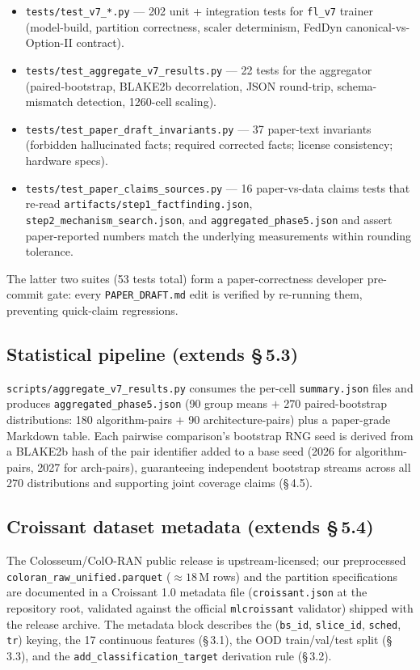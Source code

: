 \documentclass[journal]{IEEEtran}
\begin{document}
\begin{itemize}
  \item \lstinline|tests/test_v7_*.py| --- 202 unit + integration tests for \lstinline|fl_v7| trainer (model-build, partition correctness, scaler determinism, FedDyn canonical-vs-Option-II contract).
  \item \lstinline|tests/test_aggregate_v7_results.py| --- 22 tests for the aggregator (paired-bootstrap, BLAKE2b decorrelation, JSON round-trip, schema-mismatch detection, 1260-cell scaling).
  \item \lstinline|tests/test_paper_draft_invariants.py| --- 37 paper-text invariants (forbidden hallucinated facts; required corrected facts; license consistency; hardware specs).
  \item \lstinline|tests/test_paper_claims_sources.py| --- 16 paper-vs-data claims tests that re-read \lstinline|artifacts/step1_factfinding.json|, \lstinline|step2_mechanism_search.json|, and \lstinline|aggregated_phase5.json| and assert paper-reported numbers match the underlying measurements within rounding tolerance.
\end{itemize}

The latter two suites (53 tests total) form a paper-correctness developer pre-commit gate: every \lstinline|PAPER_DRAFT.md| edit is verified by re-running them, preventing quick-claim regressions.

\subsection{Statistical pipeline (extends \S\,5.3)}

\lstinline|scripts/aggregate_v7_results.py| consumes the per-cell \lstinline|summary.json| files and produces \lstinline|aggregated_phase5.json| (90 group means $+$ 270 paired-bootstrap distributions: 180 algorithm-pairs $+$ 90 architecture-pairs) plus a paper-grade Markdown table. Each pairwise comparison's bootstrap RNG seed is derived from a BLAKE2b hash of the pair identifier added to a base seed (2026 for algorithm-pairs, 2027 for arch-pairs), guaranteeing independent bootstrap streams across all 270 distributions and supporting joint coverage claims (\S\,4.5).

\subsection{Croissant dataset metadata (extends \S\,5.4)}

The Colosseum/ColO-RAN public release is upstream-licensed; our preprocessed \lstinline|coloran_raw_unified.parquet| ($\approx 18$\,M rows) and the partition specifications are documented in a Croissant 1.0 metadata file (\lstinline|croissant.json| at the repository root, validated against the official \lstinline|mlcroissant| validator) shipped with the release archive. The metadata block describes the (\lstinline|bs_id|, \lstinline|slice_id|, \lstinline|sched|, \lstinline|tr|) keying, the 17 continuous features (\S\,3.1), the OOD train/val/test split (\S\,3.3), and the \lstinline|add_classification_target| derivation rule (\S\,3.2).
\end{document}
